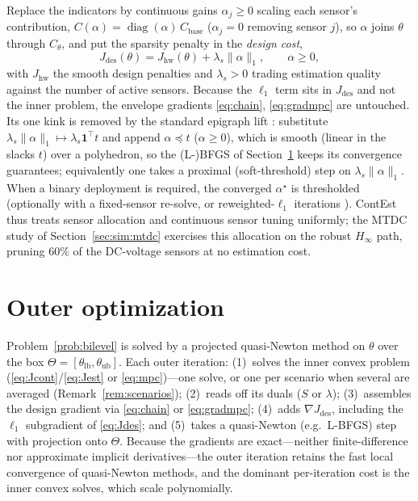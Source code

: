 \documentclass[twocolumn,amsthm]{autart}
\begin{document}
Replace the indicators by continuous gains $\alpha_j\ge0$ scaling each sensor's
contribution, $C(\alpha)=\operatorname{diag}(\alpha)\,C_{\mathrm{base}}$
($\alpha_j=0$ removing sensor $j$), so $\alpha$ joins $\theta$ through $C_\theta$,
and put the sparsity penalty in the \emph{design cost},
\begin{equation}\label{eq:Jdes}
J_{\mathrm{des}}(\theta) = J_{\mathrm{hw}}(\theta) + \lambda_s \| \alpha \|_1,
\qquad \alpha \ge 0,
\end{equation}
with $J_{\mathrm{hw}}$ the smooth design penalties and $\lambda_s>0$ trading
estimation quality against the number of active sensors. Because the $\ell_1$ term
sits in $J_{\mathrm{des}}$ and not the inner problem, the envelope gradients
\eqref{eq:chain}, \eqref{eq:gradmpc} are untouched. Its one kink is removed by the
standard epigraph lift \cite{boyd2004convex}: substitute
$\lambda_s\|\alpha\|_1\mapsto\lambda_s\mathbf 1^\top t$ and append
$\alpha\preceq t$ ($\alpha\ge0$), which is smooth (linear in the slacks $t$) over a
polyhedron, so the (L-)BFGS of Section~\ref{sec:algorithm} keeps its convergence
guarantees; equivalently one takes a proximal (soft-threshold) step on
$\lambda_s\|\alpha\|_1$. When a binary deployment is required, the converged
$\alpha^\star$ is thresholded (optionally with a fixed-sensor re-solve, or
reweighted-$\ell_1$ iterations \cite{candes2008reweighted}). ContEst thus treats
sensor allocation and continuous sensor tuning uniformly; the MTDC study of
Section~\ref{sec:sim:mtdc} exercises this allocation on the robust $H_\infty$ path,
pruning $60\%$ of the DC-voltage sensors at no estimation cost.

\section{Outer optimization}\label{sec:algorithm}

Problem~\ref{prob:bilevel} is solved by a projected quasi-Newton method on
$\theta$ over the box $\Theta = [\theta_{\mathrm{lb}},\theta_{\mathrm{ub}}]$. Each
outer iteration: (1)~solves the inner convex problem
(\eqref{eq:Jcont}/\eqref{eq:Jest} or \eqref{eq:mpc})---one solve, or one per
scenario when several are averaged (Remark~\ref{rem:scenarios});
(2)~reads off its duals ($S$ or $\lambda$); (3)~assembles the design
gradient via \eqref{eq:chain} or \eqref{eq:gradmpc}; (4)~adds
$\nabla J_{\mathrm{des}}$, including the $\ell_1$ subgradient of
\eqref{eq:Jdes}; and (5)~takes a quasi-Newton (e.g.\ L-BFGS) step with projection
onto $\Theta$. Because the gradients are exact---neither finite-difference nor
approximate implicit derivatives---the outer iteration retains the fast local
convergence of quasi-Newton methods, and the dominant per-iteration cost is the
inner convex solves, which scale polynomially.
\end{document}
